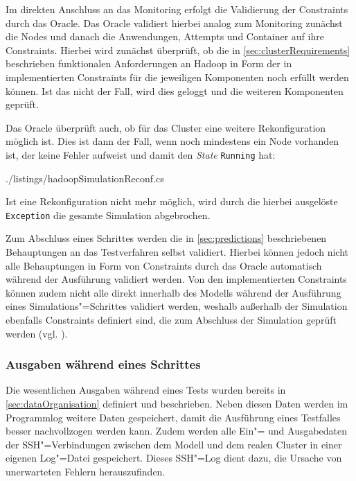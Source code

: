 Im direkten Anschluss an das Monitoring erfolgt die Validierung der Constraints durch das Oracle.
Das Oracle validiert hierbei analog zum Monitoring zunächst die Nodes und danach die Anwendungen, Attempts und Container auf ihre Constraints.
Hierbei wird zunächst überprüft, ob die in \autoref{sec:clusterRequirements} beschrieben funktionalen Anforderungen an Hadoop in Form der in  implementierten Constraints für die jeweiligen Komponenten noch erfüllt werden können.
Ist das nicht der Fall, wird dies geloggt und die weiteren Komponenten geprüft.

Das Oracle überprüft auch, ob für das Cluster eine weitere Rekonfiguration möglich ist.
Dies ist dann der Fall, wenn noch mindestens ein Node vorhanden ist, der keine Fehler aufweist und damit den \emph{State} \texttt{Running} hat:


{./listings/hadoopSimulationReconf.cs}

Ist eine Rekonfiguration nicht mehr möglich, wird durch die hierbei ausgelöste \texttt{Exception} die gesamte Simulation abgebrochen.

Zum Abschluss eines Schrittes werden die in \autoref{sec:predictions} beschriebenen Behauptungen an das Testverfahren selbst validiert.
Hierbei können jedoch nicht alle Behauptungen in Form von Constraints durch das Oracle automatisch während der Ausführung validiert werden.
Von den implementierten Constraints können zudem nicht alle direkt innerhalb des Modells während der Ausführung eines Simulations"=Schrittes validiert werden, weshalb außerhalb der Simulation ebenfalls Constraints definiert sind, die zum Abschluss der Simulation geprüft werden (vgl. ).

\subsubsection{Ausgaben während eines Schrittes}
\label{sec:simulationStepOutput}

Die wesentlichen Ausgaben während eines Tests wurden bereits in \autoref{sec:dataOrganisation} definiert und beschrieben.
Neben diesen Daten werden im Programmlog weitere Daten gespeichert, damit die Ausführung eines Testfalles besser nachvollzogen werden kann.
Zudem werden alle Ein"= und Ausgabedaten der SSH"=Verbindungen zwischen dem Modell und dem realen Cluster in einer eigenen Log"=Datei gespeichert.
Dieses SSH"=Log dient dazu, die Ursache von unerwarteten Fehlern herauszufinden.

